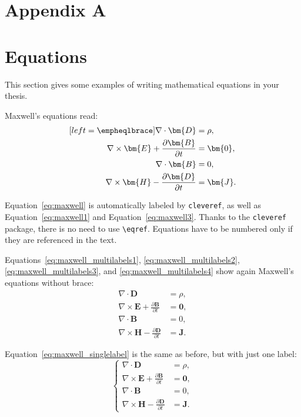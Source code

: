 \section{Appendix A}

\section{Equations}
\label{sec:eqs}
This section gives some examples of writing mathematical equations in your thesis.

Maxwell's equations read:
\begin{subequations}
	\label{eq:maxwell}
	\begin{align}[left=\empheqlbrace]
		\nabla\cdot \bm{D} & = \rho, \label{eq:maxwell1} \\
		\nabla \times \bm{E} +  \frac{\partial \bm{B}}{\partial t} & = \bm{0}, \label{eq:maxwell2} \\
		\nabla\cdot \bm{B} & = 0, \label{eq:maxwell3} \\
		\nabla \times \bm{H} - \frac{\partial \bm{D}}{\partial t} &= \bm{J}. \label{eq:maxwell4}
	\end{align}
\end{subequations}

Equation~\eqref{eq:maxwell} is automatically labeled by \texttt{cleveref},
as well as Equation~\eqref{eq:maxwell1} and Equation~\eqref{eq:maxwell3}.
Thanks to the \verb|cleveref| package, there is no need to use \verb|\eqref|.
Equations have to be numbered only if they are referenced in the text.

Equations~\eqref{eq:maxwell_multilabels1}, \eqref{eq:maxwell_multilabels2}, \eqref{eq:maxwell_multilabels3}, and \eqref{eq:maxwell_multilabels4} show again Maxwell's equations without brace:
\begin{align}
	\nabla\cdot \bm{D} & = \rho, \label{eq:maxwell_multilabels1} \\
	\nabla \times \bm{E} +  \frac{\partial \bm{B}}{\partial t} &= \bm{0}, \label{eq:maxwell_multilabels2} \\
	\nabla\cdot \bm{B} & = 0, \label{eq:maxwell_multilabels3} \\
	\nabla \times \bm{H} - \frac{\partial \bm{D}}{\partial t} &= \bm{J} \label{eq:maxwell_multilabels4}.
\end{align}

Equation~\eqref{eq:maxwell_singlelabel} is the same as before,
but with just one label:
\begin{equation}
	\label{eq:maxwell_singlelabel}
	\left\{
	\begin{aligned}
		\nabla\cdot \bm{D} & = \rho, \\
		\nabla \times \bm{E} +  \frac{\partial \bm{B}}{\partial t} &= \bm{0},\\
		\nabla\cdot \bm{B} & = 0, \\
		\nabla \times \bm{H} - \frac{\partial \bm{D}}{\partial t} &= \bm{J}.
	\end{aligned}
	\right.
\end{equation}

